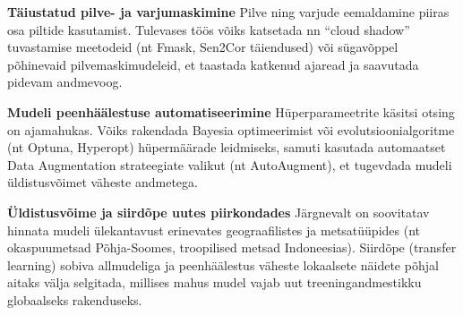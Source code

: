 \textbf{Täiustatud pilve- ja varjumaskimine} Pilve ning varjude eemaldamine piiras osa
piltide kasutamist. Tulevases töös võiks katsetada nn ``cloud shadow''
tuvastamise meetodeid (nt Fmask, Sen2Cor täiendused) või sügavõppel põhinevaid
pilvemaskimudeleid, et taastada katkenud ajaread ja saavutada pidevam andmevoog.

\textbf{Mudeli peenhäälestuse automatiseerimine} Hüperparameetrite käsitsi otsing on
ajamahukas. Võiks rakendada Bayesia optimeerimist või evolutsioonialgoritme (nt
Optuna, Hyperopt) hüpermäärade leidmiseks, samuti kasutada automaatset Data
Augmentation strateegiate valikut (nt AutoAugment), et tugevdada mudeli
üldistusvõimet väheste andmetega.

\textbf{Üldistusvõime ja siirdõpe uutes piirkondades} Järgnevalt on soovitatav hinnata
mudeli ülekantavust erinevates geograafilistes ja metsatüüpides (nt
okaspuumetsad Põhja-Soomes, troopilised metsad Indoneesias). Siirdõpe (transfer
learning) sobiva allmudeliga ja peenhäälestus väheste lokaalsete näidete põhjal
aitaks välja selgitada, millises mahus mudel vajab uut treeningandmestikku
globaalseks rakenduseks.